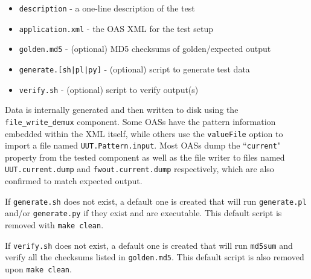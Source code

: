 \documentclass{article}
\begin{document}
\begin{itemize}{}{}
	\item \texttt{description} - a one-line description of the test
	\item \texttt{application.xml} - the OAS XML for the test setup
	\item \texttt{golden.md5} - (optional) MD5 checksums of golden/expected output
	\item \texttt{generate.[sh|pl|py]} - (optional) script to generate test data
	\item \texttt{verify.sh} - (optional) script to verify output(s)
\end{itemize}
\begin{flushleft}
	Data is internally generated and then written to disk using the \verb+file_write_demux+ component. Some OASs have the pattern information embedded within the XML itself, while others use the \texttt{valueFile} option to import a file named \verb+UUT.Pattern.input+. Most OASs dump the ``\texttt{current}" property from the tested component as well as the file writer to files named \verb+UUT.current.dump+ and \verb+fwout.current.dump+ respectively, which are also confirmed to match expected output.
	\medskip

	If \texttt{generate.sh} does not exist, a default one is created that will run \texttt{generate.pl} and/or \texttt{generate.py} if they exist and are executable. This default script is removed with \verb+make clean+.
	\medskip

	If \texttt{verify.sh} does not exist, a default one is created that will run \texttt{md5sum} and verify all the checksums listed in \texttt{golden.md5}. This default script is also removed upon \verb+make clean+.
	\medskip
\end{flushleft}
\end{document}
